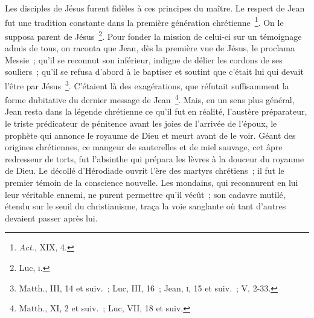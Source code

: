 \documentclass[french,twoside]{book} %
\begin{document}
Les disciples de Jésus furent fidèles à ces principes du maître. Le respect de Jean fut une tradition constante dans la première génération chrétienne \footnote{{\itshape Act.}, XIX, 4.}. On le supposa parent de Jésus \footnote{ Luc, \textsc{i}.}. Pour fonder la mission de celui-ci sur un témoignage admis de tous, on raconta que Jean, dès la première vue de Jésus, le proclama Messie ; qu’il se reconnut son inférieur, indigne de délier les cordons de ses souliers ; qu’il se refusa d’abord à le baptiser et soutint que c’était lui qui devait l’être par Jésus \footnote{ Matth., III, 14 et suiv. ; Luc, III, 16 ; Jean, \textsc{i}, 15 et suiv. ; V, 2-33.}. C’étaient là des exagérations, que réfutait suffisamment la forme dubitative du dernier message de Jean \footnote{Matth., XI, 2 et suiv. ; Luc, VII, 18 et suiv.}. Mais, en un sens plus général, Jean resta dans la légende chrétienne ce qu’il fut en réalité, l’austère préparateur, le triste prédicateur de pénitence avant les joies de l’arrivée de l’époux, le prophète qui annonce le royaume de Dieu et meurt avant de le voir. Géant des origines chrétiennes, ce mangeur de sauterelles et de miel sauvage, cet âpre redresseur de torts, fut l’absinthe qui prépara les lèvres à la douceur du royaume de Dieu. Le décollé d’Hérodiade ouvrit l’ère des martyrs chrétiens ; il fut le premier témoin de la conscience nouvelle. Les mondains, qui reconnurent en lui leur véritable ennemi, ne purent permettre qu’il vécût ; son cadavre mutilé, étendu sur le seuil du christianisme, traça la voie sanglante où tant d’autres devaient passer après lui.\par
\end{document}
